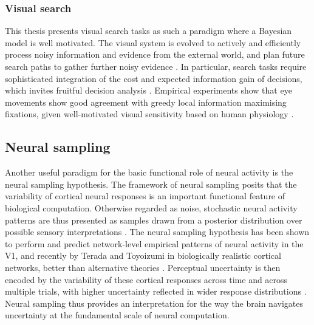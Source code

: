 \subsubsection*{Visual search}
This thesis presents visual search tasks as such a paradigm where a Bayesian model is well motivated. The visual system is evolved to actively and efficiently process noisy information and evidence from the external world, and plan future search paths to gather further noisy evidence \cite{Renninger2005-ee, renninger_where_2007, najemnik_optimal_2005, bujia_modeling_2022}. In particular, search tasks require sophisticated integration of the cost and expected information gain of decisions, which invites fruitful decision analysis \cite{Wedel_2023}. Empirical experiments show that eye movements show good agreement with greedy local information maximising fixations, given well-motivated visual sensitivity based on human physiology \cite{Radulescu_2026, najemnik_optimal_2005, renninger_where_2007}.

\subsection{Neural sampling}\label{subsec:neur_sampling}
Another useful paradigm for the basic functional role of neural activity is the neural sampling hypothesis. The framework of neural sampling posits that the variability of cortical neural responses is an important functional feature of biological computation. Otherwise regarded as noise, stochastic neural activity patterns are thus presented as samples drawn from a posterior distribution over possible sensory interpretations \cite{orban_neural_2016, NIPS2002_a486cd07}. The neural sampling hypothesis has been shown to perform and predict network-level empirical patterns of neural activity in the V1, and recently by Terada and Toyoizumi in biologically realistic cortical networks, better than alternative theories \cite{NIPS2002_a486cd07, ujfalussy_sampling_2022, terada_chaotic_2024, orban_neural_2016}. Perceptual uncertainty is then encoded by the variability of these cortical responses across time and across multiple trials, with higher uncertainty reflected in wider response distributions \cite{NIPS2002_a486cd07, delacour_neural_1997, orban_neural_2016}. Neural sampling thus provides an interpretation for the way the brain navigates uncertainty at the fundamental scale of neural computation.


